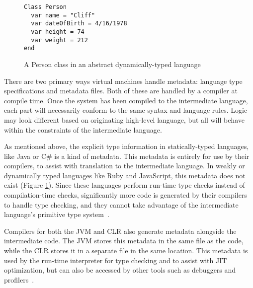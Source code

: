 \documentclass{sig-alternate}
\begin{document}
\begin{figure}
\begin{verbatim}
Class Person
  var name = "Cliff"
  var dateOfBirth = 4/16/1978
  var height = 74
  var weight = 212
end
\end{verbatim}
\caption{A Person class in an abstract dynamically-typed language}
\label{untypedExample}
\end{figure}





There are two primary ways virtual machines handle metadata: language type specifications and metadata files. Both of these are handled by a compiler at compile time.
Once the system has been compiled to the intermediate language, each part will necessarily conform to the same syntax and language rules. Logic may look different based on originating high-level language, but all will behave within the constraints of the intermediate language.

As mentioned above, the explicit type information in \linebreak
statically-typed languages, like Java or C\# is a kind of metadata. This metadata is entirely for use by their compilers, to assist with translation to the intermediate language.
In weakly or dynamically typed languages like Ruby and JavaScript, this metadata does not exist (Figure \ref{untypedExample}). Since these languages perform run-time type checks instead of compilation-time checks, significantly more code is generated by their compilers to handle type checking, and they cannot take advantage of the intermediate language's primitive type system~\cite{Li:2013}.

Compilers for both the JVM and CLR also generate metadata alongside the intermediate code. The JVM stores this metadata in the same file as the code, while the CLR stores it in a separate file in the same location. This metadata is used by the run-time interpreter for type checking and to assist with JIT optimization, but can also be accessed by other tools such as debuggers and profilers~\cite{Hamilton:2003}. 
\end{document}
